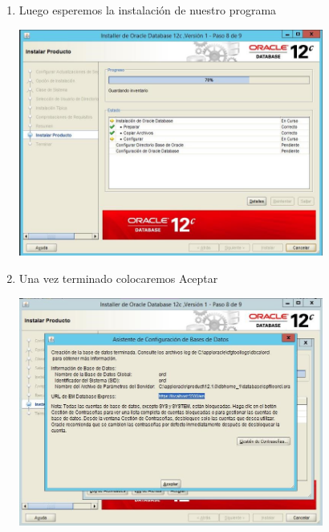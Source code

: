 \begin{enumerate}[1.]
	\hfill \break
	\hfill \break
	\hfill \break
	\hfill \break
	\hfill \break
	\hfill \break
	\hfill \break
	\hfill \break
	\item Luego esperemos la instalaci\'on de nuestro programa\\
	\begin{center}
	\includegraphics[width=10cm]{./Imagenes/mire6} 
	\end{center}

	\item Una vez terminado colocaremos Aceptar\\
	\begin{center}
	\includegraphics[width=10cm]{./Imagenes/mire7} 
	\end{center}


\end{enumerate}
